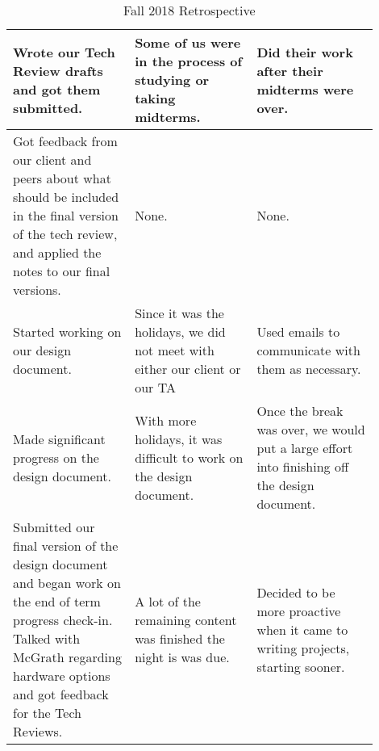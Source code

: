 \begin{table}[!ht]
\begin{tabular}{|p{0.3\linewidth} | p{0.3\linewidth} | p{0.3\linewidth} |}
        Wrote our Tech Review drafts and got them submitted. & Some of us were in the process of studying or taking midterms. & Did their work after their midterms were over. \\ \hline
        
        Got feedback from our client and peers about what should be included in the final version of the tech review, and applied the notes to our final versions.& None. & None. \\ \hline
        
        Started working on our design document.& Since it was the holidays, we did not meet with either our client or our TA & Used emails to communicate with them as necessary. \\ \hline
        
        Made significant progress on the design document.& With more holidays, it was difficult to work on the design document. & Once the break was over, we would put a large effort into finishing off the design document. \\ \hline
        
        Submitted our final version of the design document and began work on the end of term progress check-in. Talked with McGrath regarding hardware options and got feedback for the Tech Reviews.& A lot of the remaining content was finished the night is was due. & Decided to be more proactive when it came to writing projects, starting sooner. \\ \hline
        
    \end{tabular}
    \newline
    \caption{Fall 2018 Retrospective}
    \label{tab:retro}
\end{table}